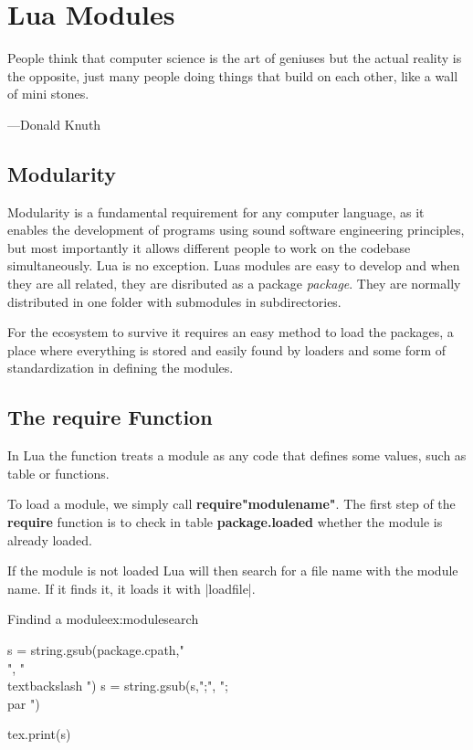 \newfontfamily{}

           
\chapter{Lua Modules}

\epigraph{People think that computer science is the art of geniuses but the actual reality is the opposite, just many people doing things that build on each other, like a wall of mini stones.}{---Donald Knuth}


\section{Modularity}

Modularity is a fundamental requirement for any computer language, as it enables the development of programs using sound software engineering principles, but most importantly it allows different people to work on the codebase simultaneously. Lua is no exception. Luas modules are easy to develop and when they are all related, they are disributed as a package \textit{package}. They are normally distributed in one folder with submodules in subdirectories. 

For the ecosystem to survive it requires an easy method to load the packages, a place where everything is stored and easily found by loaders and some form of standardization in defining the modules. 

\section{The require Function}

In Lua the  function treats a module as any code that defines some values, such as table or functions. 

To load  a module, we simply call \textbf{require"modulename"}. The first step of the \textbf{require} function is to check in table \textbf{package.loaded} whether the module is already loaded.

If the module is not loaded Lua will then search for a file name with the module name. If it finds it, it loads it with |loadfile|. 


\begin{texexample}{Findind a module}{ex:modulesearch}
\begin{luacode*}
s = string.gsub(package.cpath,"\\", "\\textbackslash ")
s = string.gsub(s,";", ";\\par ")

tex.print(s)
\end{luacode*}
\end{texexample}

